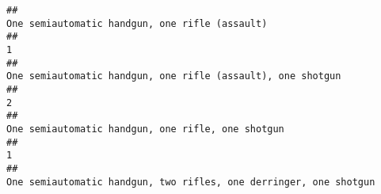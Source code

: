 \documentclass[
]{article}
\begin{document}
\begin{verbatim}
##                                                                                                                                                                                                                                                                                                                                                        One semiautomatic handgun, one rifle (assault) 
##                                                                                                                                                                                                                                                                                                                                                                                                     1 
##                                                                                                                                                                                                                                                                                                                                           One semiautomatic handgun, one rifle (assault), one shotgun 
##                                                                                                                                                                                                                                                                                                                                                                                                     2 
##                                                                                                                                                                                                                                                                                                                                                     One semiautomatic handgun, one rifle, one shotgun 
##                                                                                                                                                                                                                                                                                                                                                                                                     1 
##                                                                                                                                                                                                                                                                                                                                     One semiautomatic handgun, two rifles, one derringer, one shotgun 

\end{verbatim}
\end{document}
